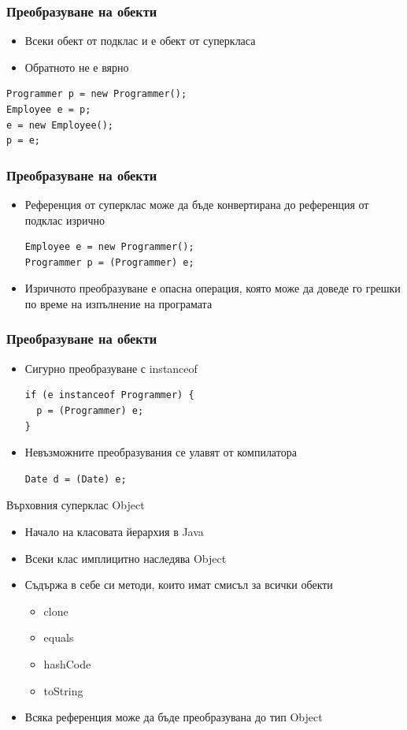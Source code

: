 \documentclass{beamer}
\begin{document}
\begin{frame}[fragile]
  \frametitle{Преобразуване на обекти}
  \transdissolve
  \begin{itemize}
  \item Всеки обект от подклас и е обект от суперкласа
  \item Обратното не е вярно
  \end{itemize}
\begin{lstlisting}
Programmer p = new Programmer();
Employee e = p;
e = new Employee();
p = e;
\end{lstlisting}
\end{frame}

\begin{frame}[fragile]
  \frametitle{Преобразуване на обекти}
  \transdissolve
  \begin{itemize}
  \item Референция от суперклас може да бъде конвертирана до
    референция от подклас изрично
    \begin{lstlisting}
Employee e = new Programmer();
Programmer p = (Programmer) e;
    \end{lstlisting}
  \item Изричното преобразуване е опасна операция, която може да
    доведе го грешки по време на изпълнение на програмата
  \end{itemize}
\end{frame}

\begin{frame}[fragile]
  \frametitle{Преобразуване на обекти}
  \transdissolve
  \begin{itemize}
  \item Сигурно преобразуване с instanceof
    \begin{lstlisting}
if (e instanceof Programmer) {
  p = (Programmer) e;
}
    \end{lstlisting}
  \item Невъзможните преобразувания се улавят от компилатора
    \begin{lstlisting}
Date d = (Date) e;
    \end{lstlisting}
  \end{itemize}
\end{frame}

\begin{frame}{Върховния суперклас Object}
  \transdissolve
  \begin{itemize}
  \item Начало на класовата йерархия в Java
  \item Всеки клас имплицитно наследява Object
  \item Съдържа в себе си методи, които имат смисъл за всички обекти
    \begin{itemize}
      \item clone
      \item equals
      \item hashCode
      \item toString
    \end{itemize}
  \item Всяка референция може да бъде преобразувана до тип Object
  \end{itemize}
\end{frame}
\end{document}
